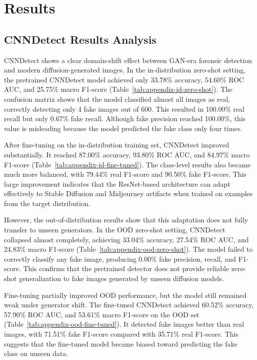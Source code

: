 \section{Results}
\label{sec:results}

\subsection{CNNDetect Results Analysis}
CNNDetect shows a clear domain-shift effect between GAN-era forensic detection and modern diffusion-generated images. In the in-distribution zero-shot setting, the pretrained CNNDetect model achieved only 33.78\% accuracy, 54.60\% ROC AUC, and 25.75\% macro F1-score (Table~\ref{tab:appendix-id-zero-shot}). The confusion matrix shows that the model classified almost all images as real, correctly detecting only 4 fake images out of 600. This resulted in 100.00\% real recall but only 0.67\% fake recall. Although fake precision reached 100.00\%, this value is misleading because the model predicted the fake class only four times.

After fine-tuning on the in-distribution training set, CNNDetect improved substantially. It reached 87.00\% accuracy, 93.80\% ROC AUC, and 84.97\% macro F1-score (Table~\ref{tab:appendix-id-fine-tuned}). The class-level results also became much more balanced, with 79.44\% real F1-score and 90.50\% fake F1-score. This large improvement indicates that the ResNet-based architecture can adapt effectively to Stable Diffusion and Midjourney artifacts when trained on examples from the target distribution.

However, the out-of-distribution results show that this adaptation does not fully transfer to unseen generators. In the OOD zero-shot setting, CNNDetect collapsed almost completely, achieving 33.04\% accuracy, 27.54\% ROC AUC, and 24.83\% macro F1-score (Table~\ref{tab:appendix-ood-zero-shot}). The model failed to correctly classify any fake image, producing 0.00\% fake precision, recall, and F1-score. This confirms that the pretrained detector does not provide reliable zero-shot generalization to fake images generated by unseen diffusion models.

Fine-tuning partially improved OOD performance, but the model still remained weak under generator shift. The fine-tuned CNNDetect achieved 60.52\% accuracy, 57.90\% ROC AUC, and 53.61\% macro F1-score on the OOD set (Table~\ref{tab:appendix-ood-fine-tuned}). It detected fake images better than real images, with 71.51\% fake F1-score compared with 35.71\% real F1-score. This suggests that the fine-tuned model became biased toward predicting the fake class on unseen data.


